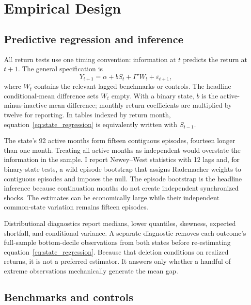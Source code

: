 \section{Empirical Design}
\label{sec:design}

\subsection{Predictive regression and inference}

All return tests use one timing convention: information at $t$ predicts the return at $t+1$. The general specification is
\begin{equation}
    Y_{t+1}=\alpha+bS_t+\Gamma'W_t+\varepsilon_{t+1},
    \label{eq:state_regression}
\end{equation}
where $W_t$ contains the relevant lagged benchmarks or controls. The headline conditional-mean difference sets $W_t$ empty. With a binary state, $b$ is the active-minus-inactive mean difference; monthly return coefficients are multiplied by twelve for reporting. In tables indexed by return month, equation~\eqref{eq:state_regression} is equivalently written with $S_{t-1}$.

The state's 92 active months form fifteen contiguous episodes, fourteen longer than one month. Treating all active months as independent would overstate the information in the sample. I report Newey--West statistics with 12 lags and, for binary-state tests, a wild episode bootstrap that assigns Rademacher weights to contiguous episodes and imposes the null. The episode bootstrap is the headline inference because continuation months do not create independent synchronized shocks. The estimates can be economically large while their independent common-state variation remains fifteen episodes.

Distributional diagnostics report medians, lower quantiles, skewness, expected shortfall, and conditional variance. A separate diagnostic removes each outcome's full-sample bottom-decile observations from both states before re-estimating equation~\eqref{eq:state_regression}. Because that deletion conditions on realized returns, it is not a preferred estimator. It answers only whether a handful of extreme observations mechanically generate the mean gap.

\subsection{Benchmarks and controls}

